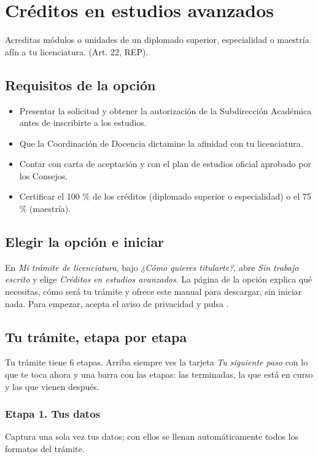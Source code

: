 \section{Créditos en estudios avanzados}
Acreditas módulos o unidades de un diplomado superior, especialidad o maestría afín a tu licenciatura. (Art. 22, REP).

\subsection{Requisitos de la opción}
\begin{itemize}
  \item Presentar la solicitud y obtener la autorización de la Subdirección Académica antes de inscribirte a los estudios.
  \item Que la Coordinación de Docencia dictamine la afinidad con tu licenciatura.
  \item Contar con carta de aceptación y con el plan de estudios oficial aprobado por los Consejos.
  \item Certificar el 100 \% de los créditos (diplomado superior o especialidad) o el 75 \% (maestría).
\end{itemize}
\subsection{Elegir la opción e iniciar}
En \emph{Mi trámite de licenciatura}, bajo \emph{¿Cómo quieres titularte?}, abre \emph{Sin trabajo escrito} y elige \emph{Créditos en estudios avanzados}. La página de la opción explica qué necesitas, cómo será tu trámite y ofrece este manual para descargar, sin iniciar nada. Para empezar, acepta el aviso de privacidad y pulsa .
\subsection{Tu trámite, etapa por etapa}
Tu trámite tiene 6 etapas. Arriba siempre ves la tarjeta \emph{Tu siguiente paso} con lo que te toca ahora y una barra con las etapas: las terminadas, la que está en curso y las que vienen después.
\subsubsection*{Etapa 1. Tus datos}
Captura una sola vez tus datos; con ellos se llenan automáticamente todos los formatos del trámite.


